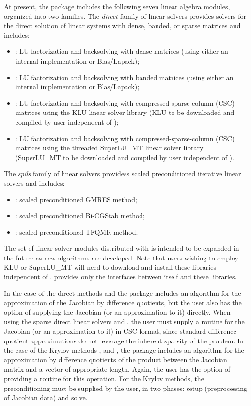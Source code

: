 At present, the package includes the following seven {\kinsol} linear algebra
modules, organized into two families. The {\em direct} family of linear
solvers provides solvers for the direct solution of linear systems with
dense, banded, or sparse matrices and includes:
\begin{itemize} 
\item {\kindense}: LU factorization and backsolving with dense matrices
  (using either an internal implementation or Blas/Lapack); 
\item {\kinband}: LU factorization and backsolving with banded matrices
  (using either an internal implementation or Blas/Lapack); 
\item {\kinklu}: LU factorization and backsolving with
  compressed-sparse-column (CSC) matrices using the KLU linear solver
  library \cite{DaPa:10,KLU_site} (KLU to be downloaded and compiled by user independent 
  of {\kinsol});
\item {\kinsuperlumt}: LU factorization and backsolving with
  compressed-sparse-column (CSC) matrices using the threaded
  SuperLU\_MT linear solver library \cite{Li:05,DGL:99,SuperLUMT_site} 
  (SuperLU\_MT to be downloaded and compiled by user independent 
  of {\kinsol}).
\end{itemize}
The {\em spils} family of linear solvers providess scaled preconditioned
iterative linear solvers and includes:
\begin{itemize} 
\item {\kinspgmr}: scaled preconditioned GMRES method;
\item {\kinspbcg}: scaled preconditioned Bi-CGStab method;
\item {\kinsptfqmr}: scaled preconditioned TFQMR method.
\end{itemize}
The set of linear solver modules distributed with {\kinsol} is intended to be expanded in the
future as new algorithms are developed.  Note that users wishing to employ KLU or 
SuperLU\_MT will need to download and install these libraries independent of {\sundials}.
{\sundials} provides only the interfaces between itself and these libraries.

In the case of the direct methods {\kindense} and {\kinband} the
package includes an algorithm for the approximation of the Jacobian by
difference quotients, but the user also has the option of supplying
the Jacobian (or an approximation to it) directly.
When using the sparse direct linear solvers {\kinklu} and
{\kinsuperlumt}, the user must supply a routine for the Jacobian (or an
approximation to it) in CSC format, since standard difference quotient
approximations do not leverage the inherent sparsity of the problem.
In the case of the Krylov methods {\kinspgmr}, {\kinspbcg} and {\kinsptfqmr},
the package includes an algorithm for the approximation by difference quotients of the
product between the Jacobian matrix and a vector of appropriate length. Again, the user
has the option of providing a routine for this operation.
For the Krylov methods, 
the preconditioning must be supplied by the user, in two phases:
setup (preprocessing of Jacobian data) and solve.

